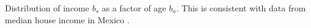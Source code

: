 Distribution of income $ b_s $ as a factor of age $ b_a $. This is consistent with data from median house income in Mexico \cite{gallup2013}.